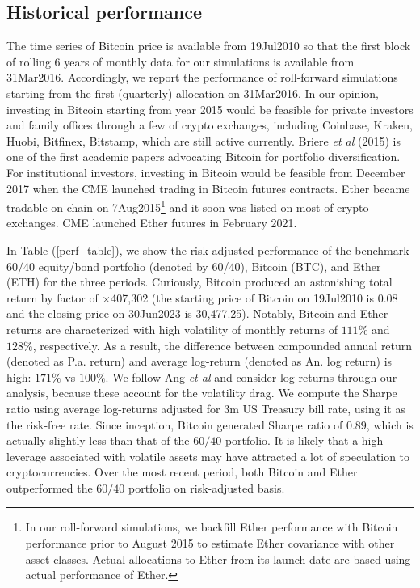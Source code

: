 \documentclass[pdftex,11pt,a4paper] {article}
\begin{document}
\subsection{Historical performance}


The time series of Bitcoin price is available from 19Jul2010 so that the first block of rolling 6 years of monthly data for our simulations is available from 31Mar2016. Accordingly, we report the performance of roll-forward simulations starting from the first (quarterly) allocation on 31Mar2016. In our opinion, investing in Bitcoin starting from year 2015 would be feasible for private investors and family offices through a few of crypto exchanges, including Coinbase, Kraken, Huobi, Bitfinex, Bitstamp, which are still active currently. Briere \textit{et al} (2015) \cite{Briere2015} is one of the first academic papers advocating Bitcoin for portfolio diversification. For institutional investors, investing in Bitcoin would be feasible from December 2017 when the CME launched trading in Bitcoin futures contracts. Ether became tradable on-chain on 7Aug2015\footnote{In our roll-forward simulations, we backfill Ether performance with Bitcoin performance prior to August 2015 to estimate Ether covariance with other asset classes. Actual allocations to Ether from its launch date are based using actual performance of Ether.} and it soon was listed on most of crypto exchanges. CME launched Ether futures in February 2021.



In Table (\ref{perf_table}), we show the risk-adjusted performance of the benchmark $60/40$ equity/bond portfolio (denoted by 60/40), Bitcoin (BTC), and Ether (ETH) for the three periods. Curiously, Bitcoin produced an astonishing total return by factor of $\times$407,302 (the starting price of Bitcoin on 19Jul2010 is 0.08 and the closing price on 30Jun2023 is 30,477.25). Notably, Bitcoin and Ether returns are characterized with high volatility of monthly returns of $111\%$ and $128\%$, respectively. As a result, the difference between compounded annual return (denoted as P.a. return) and average log-return (denoted as An. log return) is high: $171\%$ vs $100\%$. We follow Ang \textit{et al} \cite{Ang2022} and consider log-returns through our analysis, because these account for the volatility drag. We compute the Sharpe ratio using average log-returns adjusted for 3m US Treasury bill rate, using it as the risk-free rate. Since inception, Bitcoin generated Sharpe ratio of $0.89$, which is actually slightly less than that of the $60/40$ portfolio. It is likely that a high leverage associated with volatile assets may have attracted a lot of speculation to cryptocurrencies. Over the most recent period, both Bitcoin and Ether outperformed the $60/40$ portfolio on risk-adjusted basis.\vspace*{-1.0\baselineskip}
\end{document}
